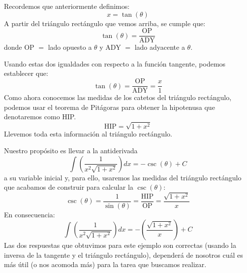 \documentclass[12pt]{article}
\begin{document}
\begin{figure}[hbt!]
\centering
{}

\end{figure}

Recordemos que anteriormente definimos:
\[
  x = \tan(\theta)
\]
A partir del triángulo rectángulo que vemos arriba, se cumple que:
\[
  \tan(\theta) = \frac{\text{OP}}{\text{ADY}}
\]
donde OP $=$ lado opuesto a $\theta$ y ADY $=$ lado adyacente a $\theta$.

Usando estas dos igualdades con respecto a la función tangente, podemos establecer que:
\[
\tan(\theta) = \frac{\text{OP}}{\text{ADY}} = \frac{x}{1}
\]
Como ahora conocemos las medidas de los catetos del triángulo rectángulo, podemos usar el teorema de Pitágoras para obtener la hipotenusa que denotaremos como HIP.
\[
  \text{HIP} = \sqrt{1 + x^{2}}
\]
Llevemos toda esta información al triángulo rectángulo.

\newpage

\begin{figure}[hbt!]
\centering


\end{figure}

Nuestro propósito es llevar a la antiderivada
\[
  \int \left(\frac{1}{x^{2}\sqrt{1 + x^{2}}}\right) dx = - \csc(\theta) + C
\]
a su variable inicial y, para ello, usaremos las medidas del triángulo rectángulo que acabamos de construir para calcular la $\csc(\theta)$:
\[
  \csc(\theta) = \frac{1}{\sin(\theta)} = \frac{\text{HIP}}{\text{OP}} = \frac{\sqrt{1 + x^{2}}}{x}
\]
En consecuencia:
\[
  \int \left(\frac{1}{x^{2}\sqrt{1 + x^{2}}}\right) dx = - \left(\frac{\sqrt{1 + x^{2}}}{x}\right) + C
\]
Las dos respuestas que obtuvimos para este ejemplo son correctas (usando la inversa de la tangente y el triángulo rectángulo), dependerá de nosotros cuál es más útil (o nos acomoda más) para la tarea que buscamos realizar.
\end{document}
